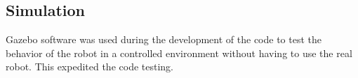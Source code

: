 \subsection{Simulation}
\label{subsec:simulation}
Gazebo software was used during the development of the code to test the behavior of the robot in a controlled environment without having to use the real robot. This expedited the code testing.